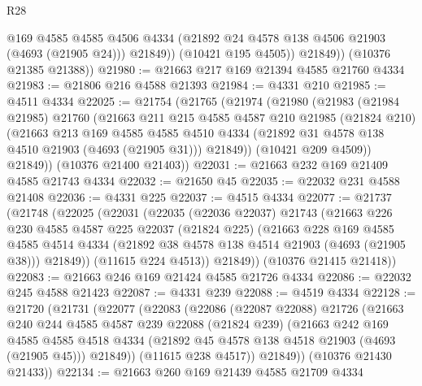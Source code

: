 \begin{lexlean}{R28}
\begin{coremodule}
                @169
                @4585
                @4585
                @4506
                @4334
                (@21892 @24 @4578 @138 @4506 @21903 (@4693 (@21905 @24)))
                @21849))
            (@10421 @195 @4505))
          @21849))
      (@10376 @21385 @21388))
@21980 := @21663 @217 @169 @21394 @4585 @21760 @4334
@21983 := @21806 @216 @4588 @21393
@21984 := @4331 @210
@21985 := @4511 @4334
@22025 := @21754
    (@21765
      (@21974
        (@21980
          (@21983
            (@21984 @21985)
            @21760
            (@21663
              @211
              @215
              @4585
              @4587
              @210
              @21985
              (@21824 @210)
              (@21663
                @213
                @169
                @4585
                @4585
                @4510
                @4334
                (@21892 @31 @4578 @138 @4510 @21903 (@4693 (@21905 @31)))
                @21849))
            (@10421 @209 @4509))
          @21849))
      (@10376 @21400 @21403))
@22031 := @21663 @232 @169 @21409 @4585 @21743 @4334
@22032 := @21650 @45
@22035 := @22032 @231 @4588 @21408
@22036 := @4331 @225
@22037 := @4515 @4334
@22077 := @21737
    (@21748
      (@22025
        (@22031
          (@22035
            (@22036 @22037)
            @21743
            (@21663
              @226
              @230
              @4585
              @4587
              @225
              @22037
              (@21824 @225)
              (@21663
                @228
                @169
                @4585
                @4585
                @4514
                @4334
                (@21892 @38 @4578 @138 @4514 @21903 (@4693 (@21905 @38)))
                @21849))
            (@11615 @224 @4513))
          @21849))
      (@10376 @21415 @21418))
@22083 := @21663 @246 @169 @21424 @4585 @21726 @4334
@22086 := @22032 @245 @4588 @21423
@22087 := @4331 @239
@22088 := @4519 @4334
@22128 := @21720
    (@21731
      (@22077
        (@22083
          (@22086
            (@22087 @22088)
            @21726
            (@21663
              @240
              @244
              @4585
              @4587
              @239
              @22088
              (@21824 @239)
              (@21663
                @242
                @169
                @4585
                @4585
                @4518
                @4334
                (@21892 @45 @4578 @138 @4518 @21903 (@4693 (@21905 @45)))
                @21849))
            (@11615 @238 @4517))
          @21849))
      (@10376 @21430 @21433))
@22134 := @21663 @260 @169 @21439 @4585 @21709 @4334

\end{coremodule}
\end{lexlean}
